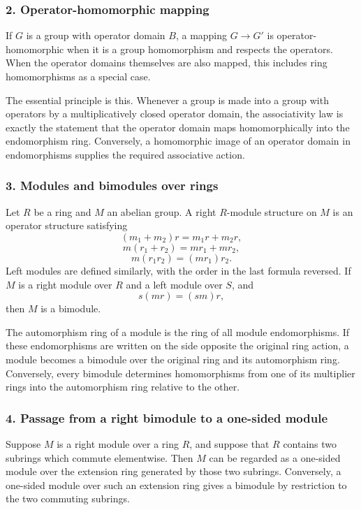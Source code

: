 \documentclass[
  11pt,
]{article}
\begin{document}
\subsubsection{2. Operator-homomorphic
mapping}\label{operator-homomorphic-mapping}

If \(G\) is a group with operator domain \(B\), a mapping \(G\to G'\) is
operator-homomorphic when it is a group homomorphism and respects the
operators. When the operator domains themselves are also mapped, this
includes ring homomorphisms as a special case.

The essential principle is this. Whenever a group is made into a group
with operators by a multiplicatively closed operator domain, the
associativity law is exactly the statement that the operator domain maps
homomorphically into the endomorphism ring. Conversely, a homomorphic
image of an operator domain in endomorphisms supplies the required
associative action.

\subsubsection{3. Modules and bimodules over
rings}\label{modules-and-bimodules-over-rings}

Let \(R\) be a ring and \(M\) an abelian group. A right \(R\)-module
structure on \(M\) is an operator structure satisfying \[
  (m_1+m_2)r=m_1r+m_2r,
\] \[
  m(r_1+r_2)=mr_1+mr_2,
\] \[
  m(r_1r_2)=(mr_1)r_2.
\] Left modules are defined similarly, with the order in the last
formula reversed. If \(M\) is a right module over \(R\) and a left
module over \(S\), and \[
  s(mr)=(sm)r,
\] then \(M\) is a bimodule.

The automorphism ring of a module is the ring of all module
endomorphisms. If these endomorphisms are written on the side opposite
the original ring action, a module becomes a bimodule over the original
ring and its automorphism ring. Conversely, every bimodule determines
homomorphisms from one of its multiplier rings into the automorphism
ring relative to the other.

\subsubsection{4. Passage from a right bimodule to a one-sided
module}\label{passage-from-a-right-bimodule-to-a-one-sided-module}

Suppose \(M\) is a right module over a ring \(R\), and suppose that
\(R\) contains two subrings which commute elementwise. Then \(M\) can be
regarded as a one-sided module over the extension ring generated by
those two subrings. Conversely, a one-sided module over such an
extension ring gives a bimodule by restriction to the two commuting
subrings.
\end{document}
